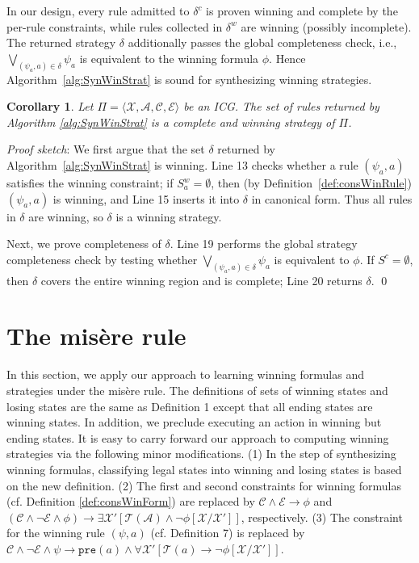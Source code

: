\documentclass[review]{elsarticle}
\newcommand{\tuple}[1]{\langle {#1} \rangle}
\newcommand{\statevar}{\mathcal{X}}
\newcommand{\act}{\mathcal{A}}
\newcommand{\trans}{\mathcal{T}}
\newcommand{\constraint}{\mathcal{C}}
\newcommand{\estate}{\mathcal{E}}
\newcommand{\pre}{\mathtt{pre}}
\newenvironment{proofsketch}{\textit{Proof sketch}:}{\qed}
\newtheorem{corollary}{Corollary}
\begin{document}
In our design, every rule admitted to $\delta^c$ is proven winning and complete by the per-rule constraints, while rules collected in $\delta^w$ are winning (possibly incomplete). The returned strategy $\delta$ additionally passes the global completeness check, i.e., $\bigvee_{(\psi_a, a) \in \delta} \psi_a$ is equivalent to the winning formula $\phi$. Hence Algorithm~\ref{alg:SynWinStrat} is sound for synthesizing winning strategies.

\begin{corollary} \label{cor:winStr}
	Let $\Pi = \tuple{\statevar, \act, \constraint, \estate}$ be an ICG.
	The set of rules returned by Algorithm \ref{alg:SynWinStrat} is a complete and winning strategy of $\Pi$.
\end{corollary}

\begin{proofsketch}
 We first argue that the set $\delta$ returned by Algorithm~\ref{alg:SynWinStrat} is winning. Line 13 checks whether a rule $(\psi_a,a)$ satisfies the winning constraint; if $S^w_a = \emptyset$, then (by Definition~\ref{def:consWinRule}) $(\psi_a,a)$ is winning, and Line 15 inserts it into $\delta$ in canonical form. Thus all rules in $\delta$ are winning, so $\delta$ is a winning strategy.

 Next, we prove completeness of $\delta$. Line 19 performs the global strategy completeness check by testing whether $\bigvee_{(\psi_a,a)\in\delta}\psi_a$ is equivalent to $\phi$. If $S^c = \emptyset$, then $\delta$ covers the entire winning region and is complete; Line 20 returns $\delta$.
\end{proofsketch}


\section{The mis\`{e}re rule} \label{sec:misere}
	In this section, we apply our approach to learning winning formulas and strategies under the mis\`{e}re rule. The definitions of sets of winning states and losing states are the same as Definition 1 except that all ending states are winning states.
	In addition, we preclude executing an action in winning but ending states.
	It is easy to carry forward our approach to computing winning strategies via the following minor modifications.
	(1) In the step of synthesizing winning formulas, classifying legal states into winning and losing states is based on the new definition.
	(2) The first and second constraints for winning formulas (cf. Definition \ref{def:consWinForm}) are replaced by $\constraint \land \estate \rightarrow \phi$ and $(\constraint \land \neg \estate \land \phi) \rightarrow \exists \statevar' [\trans(\act) \land \neg \phi[\statevar/\statevar']]$, respectively. 
	(3) The constraint for the winning rule $(\psi, a)$ (cf. Definition 7) is replaced by $\constraint \land \neg \estate \land \psi \rightarrow  \pre(a)  \land \forall \statevar' [\trans(a) \rightarrow \neg \phi[\statevar/\statevar']]$.
	
\end{document}
